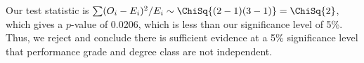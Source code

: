 \begin{solution}
\begin{ppart}
        Our test statistic is $\sum (O_i - E_i)^2 / E_i \sim \ChiSq{(2-1)(3-1)} = \ChiSq{2}$, which gives a $p$-value of 0.0206, which is less than our significance level of 5\%. Thus, we reject \nullhyp{} and conclude there is sufficient evidence at a 5\% significance level that performance grade and degree class are not independent.
    \end{ppart}
\end{solution}